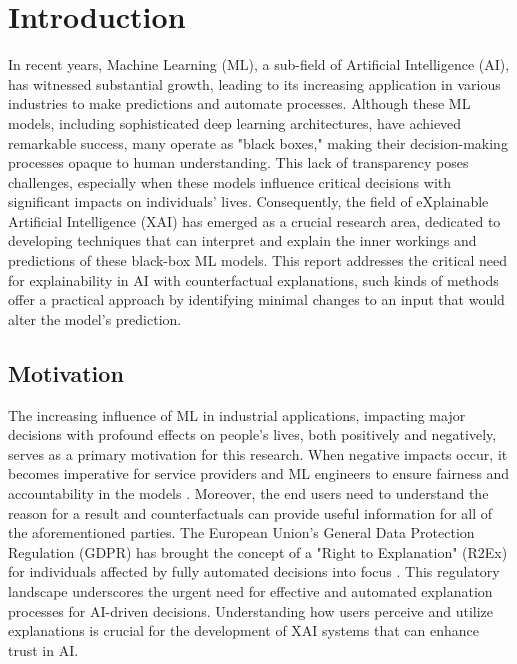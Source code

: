 \chapter{Introduction\label{chap:introduction}}
In recent years, Machine Learning (ML), a sub-field of Artificial Intelligence (AI), has witnessed substantial growth, leading to its increasing application in various industries to make predictions and automate processes. Although these ML models, including sophisticated deep learning architectures, have achieved remarkable success, many operate as "black boxes," making their decision-making processes opaque to human understanding. This lack of transparency poses challenges, especially when these models influence critical decisions with significant impacts on individuals' lives. Consequently, the field of eXplainable Artificial Intelligence (XAI) has emerged as a crucial research area, dedicated to developing techniques that can interpret and explain the inner workings and predictions of these black-box ML models. This report addresses the critical need for explainability in AI with counterfactual explanations, such kinds of methods offer a practical approach by identifying minimal changes to an input that would alter the model’s prediction.

\section{Motivation}
The increasing influence of ML in industrial applications, impacting major decisions with profound effects on people's lives, both positively and negatively, serves as a primary motivation for this research. When negative impacts occur, it becomes imperative for service providers and ML engineers to ensure fairness and accountability in the models \citep{arya2021ai}. Moreover, the end users need to understand the reason for a result and counterfactuals can provide useful information for all of the aforementioned parties. The European Union's General Data Protection Regulation (GDPR) has brought the concept of a "Right to Explanation" (R2Ex) for individuals affected by fully automated decisions into focus \citep{selbst2018meaningful}. This regulatory landscape underscores the urgent need for effective and automated explanation processes for AI-driven decisions. Understanding how users perceive and utilize explanations is crucial for the development of XAI systems that can enhance trust in AI.

